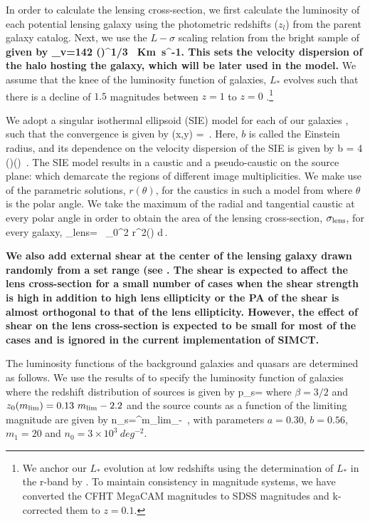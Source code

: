 \documentclass[useAMS,usenatbib,a4paper]{mn2e}
\begin{document}
In order to calculate the lensing cross-section, we first calculate the
luminosity of each potential lensing galaxy using the photometric redshifts
($z_l$) from the parent galaxy catalog. Next, we use the $L-\sigma$ scaling relation from the
bright sample of \citep{Parker2005} {\bf given by
\be
\label{magstar2}
\sigma_v=142 \left(\right)^{1/3} \, Km~s^{-1}.
\ee
This sets the velocity dispersion of the halo
hosting the galaxy, which will be later used in the model.}
We assume that the knee of the luminosity function of galaxies, $L_*$ evolves
such that there is a decline of $1.5$ magnitudes between $z=1$ to $z=0$
\citep{Faber2007}.\footnote{We anchor our $L_*$ evolution at low redshifts using the
determination of $L_*$ in the r-band by \citet{Blanton2001}. To maintain
consistency in magnitude systems, we have converted the CFHT MegaCAM magnitudes
to SDSS magnitudes and k-corrected them to $z=0.1$.}

We adopt a singular isothermal ellipsoid (SIE) model for each of our galaxies
\citep{Kormann1994}, such that the convergence is given by
\be
\kappa (x,y) =  \,.
\ee
Here, $b$ is called the Einstein radius, and its dependence on the velocity
dispersion of the SIE is given by
\be
b = 4\pi\,
\left(\right)\left(\right) \,.
\ee
The SIE model results in a caustic and a pseudo-caustic on the source
plane: which demarcate the regions of different image multiplicities. We
make use of the parametric solutions, $r(\theta)$, for the caustics in
such a model from \citet{Keeton2000b} where $\theta$ is the polar angle.
We take the maximum of the radial and tangential caustic at every polar
angle in order to obtain the area of the lensing cross-section,
$\sigma_{\rm lens}$, for every galaxy,
\be
\sigma_{\rm lens}= \, \int_0^{2\pi} r^2(\theta) d\theta \,.
\ee

{\bf We also add external shear at the center of the lensing galaxy
drawn randomly from a set range (see . The shear is
expected to affect the lens cross-section for a small number of cases
when the shear strength is high in addition to high lens ellipticity or
the PA of the shear is almost orthogonal to that of the lens
ellipticity. However, the effect of shear on the lens cross-section is
expected to be small for most of the cases and is ignored in the current
implementation of SIMCT.}

The luminosity functions of the background galaxies and quasars are
determined as follows. We use the results of \citet{Faure2009} to specify the luminosity
function of galaxies where the redshift distribution of sources is
given by
\be
\label{eqn:ps}
p_s=
\ee
where $\beta=3/2$ and $z_0(m_{\rm lim})=0.13~m_{\rm lim} - 2.2$ and the source
counts as a function of the limiting magnitude are given by
\be
\label{eqn:ns}
n_s=\int^{m_{\rm lim}}_{-\infty} 
\,,
\ee
with parameters $a=0.30$, $b=0.56$, $m_1=20$ and $n_0=3\times10^3~deg^{-2}$.
\end{document}
